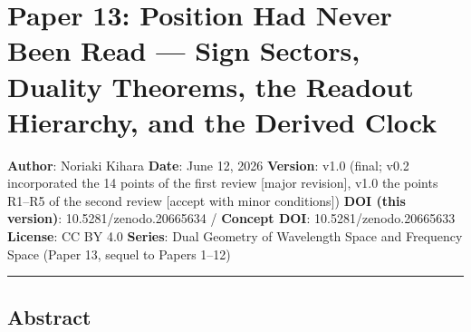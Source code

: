 \documentclass[
]{article}
\author{}
\date{}
\begin{document}
\section{Paper 13: Position Had Never Been Read --- Sign Sectors,
Duality Theorems, the Readout Hierarchy, and the Derived
Clock}\label{paper-13-position-had-never-been-read-sign-sectors-duality-theorems-the-readout-hierarchy-and-the-derived-clock}

\textbf{Author}: Noriaki Kihara \textbf{Date}: June 12, 2026
\textbf{Version}: v1.0 (final; v0.2 incorporated the 14 points of the
first review {[}major revision{]}, v1.0 the points R1--R5 of the second
review {[}accept with minor conditions{]}) \textbf{DOI (this version)}:
10.5281/zenodo.20665634 / \textbf{Concept DOI}: 10.5281/zenodo.20665633
\textbf{License}: CC BY 4.0 \textbf{Series}: Dual Geometry of Wavelength
Space and Frequency Space (Paper 13, sequel to Papers 1--12)

\begin{center}\rule{0.5\linewidth}{0.5pt}\end{center}

\subsection{Abstract}\label{abstract}
\end{document}
